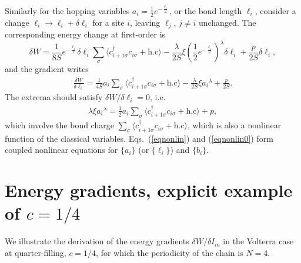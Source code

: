 \documentclass[]{revtex4-1}
\begin{document}
Similarly for the hopping variables $a_i=\frac{1}{2} e^{-\frac{\ell_i}{2}}$, or the bond length $\ell_i$, consider a change $\ell_i \rightarrow \ell_i+\delta \ell_i$ for a site $i$, leaving $\ell_j$, $j\neq i$ unchanged. The corresponding energy change at first-order is
\begin{equation}
\delta W=  \frac{1}{8S} e^{-\frac{\ell_i}{2}}  \delta \ell_i \sum_{\sigma} \langle c_{i+1 \sigma}^{\dagger} c_{i\sigma} +\mbox{h.c} \rangle - \frac{\lambda}{2S} \xi (\frac{1}{2} e^{-\frac{\ell_i}{2}})^{\lambda} \delta \ell_i  + \frac{p}{2S} \delta \ell_i, 
\end{equation}
and the gradient writes
\begin{eqnarray}
  \frac{\delta W}{\delta \ell_i}=  \frac{1}{4S} a_i  \sum_{\sigma} \langle c_{i+1 \sigma}^{\dagger} c_{i\sigma} +\mbox{h.c} \rangle - \frac{\lambda}{2S} \xi {a_i}^{\lambda}  + \frac{p}{2S}. \label{secondgradient} 
\end{eqnarray}
The extrema should satisfy $\delta W/\delta \ell_i= 0$, i.e.
\begin{eqnarray}
\lambda \xi  {a_i}^{\lambda}  =  \frac{1}{2} a_i   \sum_{\sigma} \langle c_{i+1 \sigma}^{\dagger} c_{i \sigma} +\mbox{h.c} \rangle   + p, 
\label{eqnonlin}
\end{eqnarray}
which involve the bond charge $\sum_{\sigma} \langle c_{i+1 \sigma}^{\dagger} c_{i \sigma} +\mbox{h.c} \rangle$, which is also a nonlinear function of the classical variables. Eqs.~(\ref{eqnonlin}) and (\ref{eqnonlin0}) form coupled nonlinear equations for $\{a_i\}$ (or $\{\ell_i\}$) and $\{b_i\}$.

\section{Energy gradients, explicit example of $c=1/4$}
\label{appquarter}

We illustrate the derivation of the energy gradients $\delta W/\delta I_m$ in the Volterra case at quarter-filling, $c=1/4$, for which the periodicity of the chain is $N=4$.
\end{document}
